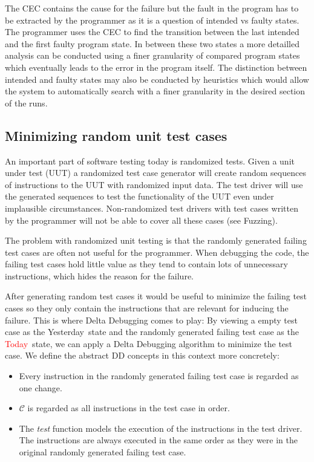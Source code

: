 \documentclass[a4paper,UKenglish]{lipics-v2018}
\newcommand{\green}[1]{\textcolor{td-green}{#1}}
\newcommand{\red}[1]{\textcolor{red}{#1}}
\newcommand{\yd}[0]{\green{Yesterday}}
\newcommand{\td}[0]{\red{Today}}
\newcommand{\C}[0]{\ensuremath{\mathcal{C}}}
\begin{document}
The CEC contains the cause for the failure but the fault in the program has to be extracted by the programmer as it is a question of intended vs faulty states. The programmer uses the CEC to find the transition between the last intended and the first faulty program state. In between these two states a more detailled analysis can be conducted using a finer granularity of compared program states which eventually leads to the error in the program itself. The distinction between intended and faulty states may also be conducted by heuristics which would allow the system to automatically search with a finer granularity in the desired section of the runs.



\subsection{Minimizing random unit test cases}

An important part of software testing today is randomized tests. Given a unit under test (UUT) a randomized test case generator will create random sequences of instructions to the UUT with randomized input data. The test driver will use the generated sequences to test the functionality of the UUT even under implausible circumstances. Non-randomized test drivers with test cases written by the programmer will not be able to cover all these cases (see Fuzzing).%

The problem with randomized unit testing is that the randomly generated failing test cases are often not useful for the programmer. When debugging the code, the failing test cases hold little value as they tend to contain lots of unnecessary instructions, which hides the reason for the failure. 

After generating random test cases it would be useful to minimize the failing test cases so they only contain the instructions that are relevant for inducing the failure. This is where Delta Debugging comes to play: By viewing a empty test case as the \yd\ state and the randomly generated failing test case as the \td\ state, we can apply a Delta Debugging algorithm to minimize the test case. We define the abstract DD concepts in this context more concretely:

\begin{itemize}
	\item Every instruction in the randomly generated failing test case is regarded as one change.
	\item $\C$ is regarded as all instructions in the test case in order.
	\item The \textit{test} function models the execution of the instructions in the test driver. The instructions are always executed in the same order as they were in the original randomly generated failing test case. 
\end{itemize}
\end{document}
